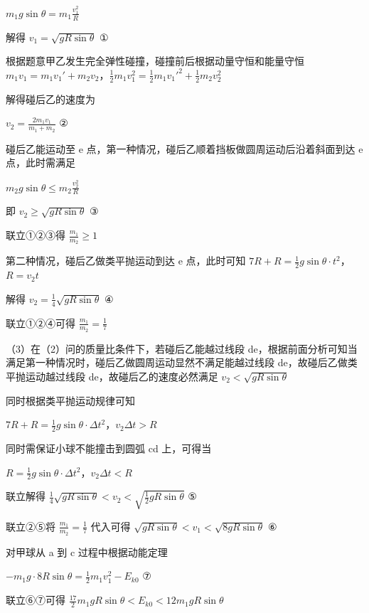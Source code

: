 \documentclass[\gkver]{gaokaozhenti}
\begin{document}
\begin{enumerate}
{$m_{1}g\sin\theta = m_{1}\frac{v_{1}^{2}}{R}$

解得 $v_{1} = \sqrt{gR\sin\theta}$ ①

根据题意甲乙发生完全弹性碰撞，碰撞前后根据动量守恒和能量守恒 $m_{1}v_{1} = m_{1}v_{1}' + m_{2}v_{2}$，$\frac{1}{2}m_{1}v_{1}^{2} = \frac{1}{2}m_{1}v_{1}'^{2} + \frac{1}{2}m_{2}v_{2}^{2}$

解得碰后乙的速度为

$v_{2} = \frac{2m_{1}v_{1}}{m_{1} + m_{2}}$ ②

碰后乙能运动至 e 点，第一种情况，碰后乙顺着挡板做圆周运动后沿着斜面到达 e 点，此时需满足

$m_{2}g\sin\theta \leq m_{2}\frac{v_{2}^{2}}{R}$

即 $v_{2} \geq \sqrt{gR\sin\theta}$ ③

联立①②③得 $\frac{m_{1}}{m_{2}} \geq 1$

第二种情况，碰后乙做类平抛运动到达 e 点，此时可知 $7R + R = \frac{1}{2}g\sin\theta\cdot t^{2}$，$R = v_{2}t$

解得 $v_{2} = \frac{1}{4}\sqrt{gR\sin\theta}$ ④

联立①②④可得 $\frac{m_{1}}{m_{2}} = \frac{1}{7}$

（3）在（2）问的质量比条件下，若碰后乙能越过线段 de，根据前面分析可知当满足第一种情况时，碰后乙做圆周运动显然不满足能越过线段 de，故碰后乙做类平抛运动越过线段 de，故碰后乙的速度必然满足 $v_{2} < \sqrt{gR\sin\theta}$

同时根据类平抛运动规律可知

$7R + R = \frac{1}{2}g\sin\theta\cdot\Delta t^{2}$，$v_{2}\Delta t > R$

同时需保证小球不能撞击到圆弧 cd 上，可得当

$R = \frac{1}{2}g\sin\theta\cdot\Delta t^{2}$，$v_{2}\Delta t < R$

联立解得 $\frac{1}{4}\sqrt{gR\sin\theta} < v_{2} < \sqrt{\frac{1}{2}gR\sin\theta}$ ⑤

联立②⑤将 $\frac{m_{1}}{m_{2}} = \frac{1}{7}$ 代入可得 $\sqrt{gR\sin\theta} < v_{1} < \sqrt{8gR\sin\theta}$ ⑥

对甲球从 a 到 c 过程中根据动能定理

$-m_{1}g\cdot 8R\sin\theta = \frac{1}{2}m_{1}v_{1}^{2} - E_{k0}$ ⑦

联立⑥⑦可得 $\frac{17}{2}m_{1}gR\sin\theta < E_{k0} < 12m_{1}gR\sin\theta$
}

\end{enumerate}
\end{document}
